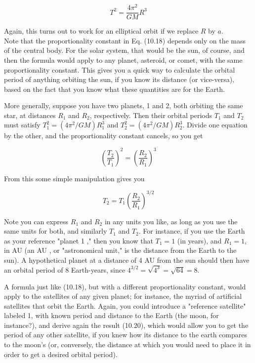 \documentclass[10pt]{article}
\begin{document}
\begin{equation*}
T^{2}=\frac{4 \pi^{2}}{G M} R^{3} \tag{10.18}
\end{equation*}


Again, this turns out to work for an elliptical orbit if we replace $R$ by $a$.\\
Note that the proportionality constant in Eq. (10.18) depends only on the mass of the central body. For the solar system, that would be the sun, of course, and then the formula would apply to any planet, asteroid, or comet, with the same proportionality constant. This gives you a quick way to calculate the orbital period of anything orbiting the sun, if you know its distance (or vice-versa), based on the fact that you know what these quantities are for the Earth.

More generally, suppose you have two planets, 1 and 2, both orbiting the same star, at distances $R_{1}$ and $R_{2}$, respectively. Then their orbital periods $T_{1}$ and $T_{2}$ must satisfy $T_{1}^{2}=\left(4 \pi^{2} / G M\right) R_{1}^{3}$ and $T_{2}^{2}=\left(4 \pi^{2} / G M\right) R_{2}^{3}$. Divide one equation by the other, and the proportionality constant cancels, so you get


\begin{equation*}
\left(\frac{T_{2}}{T_{1}}\right)^{2}=\left(\frac{R_{2}}{R_{1}}\right)^{3} \tag{10.19}
\end{equation*}


From this some simple manipulation gives you


\begin{equation*}
T_{2}=T_{1}\left(\frac{R_{2}}{R_{1}}\right)^{3 / 2} \tag{10.20}
\end{equation*}


Note you can express $R_{1}$ and $R_{2}$ in any units you like, as long as you use the same units for both, and similarly $T_{1}$ and $T_{2}$. For instance, if you use the Earth as your reference "planet 1 ," then you know that $T_{1}=1$ (in years), and $R_{1}=1$, in AU (an AU , or "astronomical unit," is the distance from the Earth to the sun). A hypothetical planet at a distance of 4 AU from the sun should then have an orbital period of 8 Earth-years, since $4^{3 / 2}=\sqrt{4^{3}}=\sqrt{64}=8$.

A formula just like (10.18), but with a different proportionality constant, would apply to the satellites of any given planet; for instance, the myriad of artificial satellites that orbit the Earth. Again, you could introduce a "reference satellite" labeled 1, with known period and distance to the Earth (the moon, for instance?), and derive again the result (10.20), which would allow you to get the period of any other satellite, if you knew how its distance to the earth compares to the moon's (or, conversely, the distance at which you would need to place it in order to get a desired orbital period).
\end{document}
